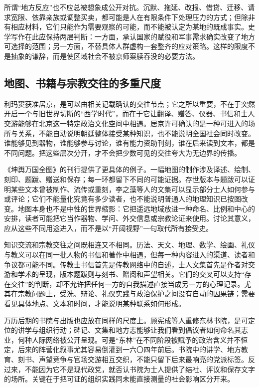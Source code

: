 所谓“地方反应”也不应总被想象成公开对抗。沉默、拖延、改报、借贷、迁移、请求宽限、依靠亲族或调整买卖，都可能是人在有限条件下处理压力的方式；但除非有相应材料，它们只能作为需要观察的可能，而不能被认定为某地的既成事实。史学写作在此应保持两层判断：一方面，承认国家的赋役和军事需求确实改变了地方可选择的范围；另一方面，不替具体人群虚构一套整齐的应对策略。这样的限度不是抽象的谦辞，而是使区域社会不被京师案牍吞没的必要方法。

\subsection{地图、书籍与宗教交往的多重尺度}

利玛窦获准居京，是可以由相关记载确认的交往节点；它之所以重要，不在于突然开启一个与旧世界切断的“西学时代”，而在于它让翻译、赠答、仪器、书信和士人交游能够在北京这一特定政治文化空间中相遇。居京许可确认的是一种可进入的场所与关系，不能自动说明朝廷整体接受某种知识，也不能说明全国社会同时改变。谁能够见到器物，谁能够参与讨论，谁有能力资助刊刻，谁在后来读到文本，都是不同问题。把这些层次分开，才不会把少数可见的交往夸大为无边界的传播。

《坤舆万国全图》的刊行提供了更具体的例子。一幅地图的制作涉及译述、绘制、刻印、题跋、赠送和保存；每一环都留下不同的可能证据。存世版本与题跋可以证明某些文本曾被制作、流传或重刻，李之藻等人的文集可以显示部分士人如何参与或评论；它们不能量化究竟有多少读者，也不能说明普通人的地理知识已按图改变。地图本身也不是中性的世界缩影：它把遥远地域放进一种命名、比例和中心的安排，读者可能把它当作器物、学问、外交信息或宗教论证来使用。讨论其意义，应从这些不同用途进入，而不是以“开阔视野”一句取代所有接受史。

知识交流和宗教交往之间既相连又不相同。历法、天文、地理、数学、绘画、礼仪与教义可以在同一批人物的书信和著作中相遇，但每一种内容进入的渠道、读者和争议都可能不同。传教士书信首先是传教网络中的自述，士人文集首先是作者对交游和学术的呈现，版本题跋则与刻书、赠阅和声望相关。它们的交叉可以支持“存在交往”的判断，却不允许把任何一方的自我描述直接当成另一方的心理记录。尤其在宗教问题上，受洗、辩论、礼仪实践与政治保护之间没有自动的因果链；需要看见具体地点、文本和时间，才能说明某种联系如何形成。

万历后期的书院与出版也应放在同样的尺度上。顾宪成等人重修东林书院，是可定位的讲学与组织行动；碑记、文集和地方志能够让我们看到倡议者如何命名其志业，何种人际网络被公开呈现。可是“东林”在不同阶段被赋予的政治含义并不恒定，后来的阵营化叙事尤其容易倒灌到一六〇四年前后。书院中的讲学、地方教育、刻书、声望竞争与官场交游相互交织，不能只留下后来最响亮的党派标签。反过来，不能因为它不是现代政党，就否认书院为士人提供了结社、评议和保存文字的场所。关键在于把可证的组织实践同未能直接测量的社会影响区分开来。

